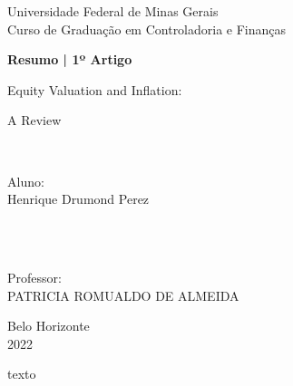 \documentclass[12pt, a4paper]{article}
\begin{document}
\begin{titlepage} 

\begin{center}
{\large Universidade Federal de Minas Gerais}\\[0.2cm]

{\large Curso de Graduação em Controladoria e Finanças}\\[5.1cm]
{\bf \huge Resumo | 1º Artigo

Equity Valuation and Inflation:

A Review}\\[2.3cm] 
\end{center}

{\large Aluno:\\
Henrique Drumond Perez



\

}\\[0.7cm] 
 
{\large Professor:\\
PATRICIA ROMUALDO DE ALMEIDA}\\[1.6cm]

\begin{center}
{\large Belo Horizonte}\\[0.2cm]
{\large 2022}
\end{center}

\end{titlepage}

\newpage

texto
\end{document}
